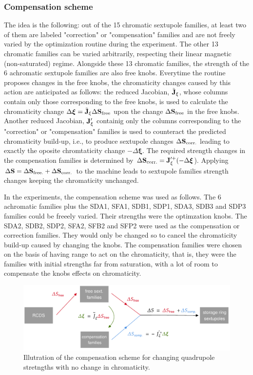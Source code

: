 \subsubsection{Compensation scheme}
\label{subsubsec:compensation}
The idea is the following: out of the 15 chromatic sextupole families, at least two of them are labeled "correction" or "compensation" families and are not freely varied by the optimization routine during the experiment. The other 13 chromatic families can be varied arbitrarily, respecting their linear magnetic (non-saturated) regime. Alongside these 13 chromatic families, the strength of the 6 achromatic sextupole families are also free knobs.  Everytime the routine proposes changes in the free knobs, the chromaticity changes caused by this action are anticipated as follows: the reduced Jacobian, $\tilde{\vb{J}}_\xi$, whose columns contain only those corresponding to the free knobs, is used to calculate the chromaticity change $\Delta \boldsymbol{\xi}=\tilde{\vb{J}}_\xi\Delta\vb{S}_{\text{free}}$ upon the change $\Delta\vb{S}_{\text{free}}$ in the free knobs. Another reduced Jacobian, $\vb{J}_{\xi}^{\prime}$ containig only the columns corresponding to the "correction" or "compensation" families is used to counteract the predicted chromaticity build-up, i.e., to produce sextupole changes $\Delta\vb{S}_{\text{corr.}}$ leading to exactly the oposite chromtaticity change $-\Delta \boldsymbol{\xi}$. The required strength changes in the compensation families is determined by $\Delta \vb{S}_{\text{corr.}} = \vb{J}_{\xi}^{\prime +}(-\Delta \boldsymbol{\xi}$). Applying $\Delta \vb{S} = \Delta \vb{S}_{\text{free.}} + \Delta \vb{S}_{\text{corr.}}$ to the machine leads to sextupole families strength changes keeping the chromaticity unchanged.

In the experiments, the compensation scheme was used as follows. The 6 achromatic families plus the SDA1, SFA1, SDB1, SDP1, SDA3, SDB3 and SDP3 families could be freeely varied. Their strengths were the optimzation knobs. The SDA2, SDB2, SDP2, SFA2, SFB2 and SFP2 were used as the compensation or correction families. They would only be changed so to cancel the chromaticity build-up caused by changing the knobs. The compensation families were chosen on the basis of having range to act on the chromaticity, that is, they were the families with initial strengths far from saturation, with a lot of room to compensate the knobs effects on chromaticity.
\begin{figure}
    \centering
    \includegraphics[width=\textwidth]{Images/compensation_scheme.pdf}
    \caption{Illutration of the compensation scheme for changing quadrupole stretngths with no change in chromaticity.}
\end{figure}
